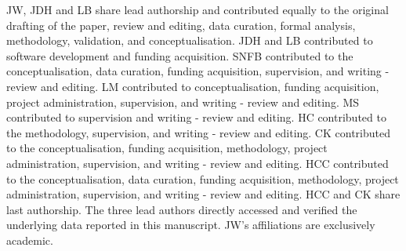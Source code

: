 {JW, JDH and LB share lead authorship and contributed equally to the original drafting of the paper, review and editing, data curation, formal analysis, methodology, validation, and conceptualisation. JDH and LB contributed to software development and funding acquisition. SNFB contributed to the conceptualisation, data curation, funding acquisition, supervision, and writing - review and editing. LM contributed to conceptualisation, funding acquisition, project administration, supervision, and writing - review and editing. MS contributed to supervision and writing - review and editing. HC contributed to the methodology, supervision, and writing - review and editing. CK contributed to the conceptualisation, funding acquisition, methodology, project administration, supervision, and writing - review and editing. HCC contributed to the conceptualisation, data curation, funding acquisition, methodology, project administration, supervision, and writing - review and editing. HCC and CK share last authorship. The three lead authors directly accessed and verified the underlying data reported in this manuscript. JW's affiliations are exclusively academic.



}
